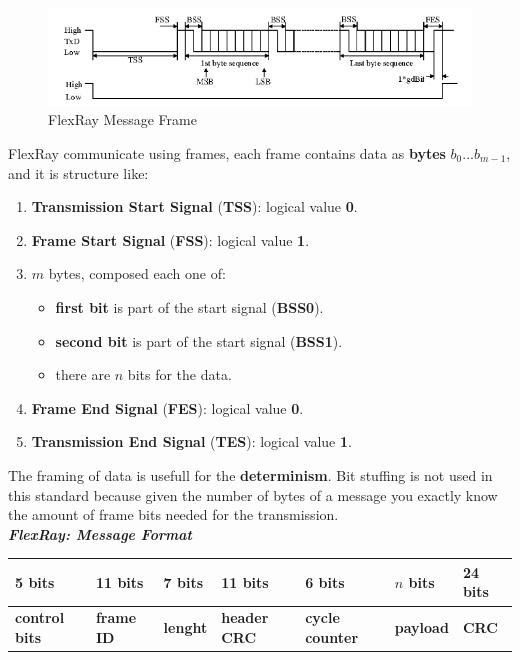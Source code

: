 \begin{figure}[h]
    \centering
    \includegraphics[width=\textwidth]{img/flexray_frame}
    \caption{FlexRay Message Frame}
\end{figure}
FlexRay communicate using frames, each frame contains data as \textbf{bytes} $b_0... b_{m-1}$, and it is structure like:
\begin{enumerate}[nosep]
    \item \textbf{Transmission Start Signal} (\textbf{TSS}): logical value \textbf{0}.
    \item \textbf{Frame Start Signal} (\textbf{FSS}): logical value \textbf{1}.
    \item $m$ bytes, composed each one of:
    \begin{itemize}[nosep]
        \item \textbf{first bit} is part of the start signal (\textbf{BSS0}).
        \item \textbf{second bit} is part of the start signal (\textbf{BSS1}).
        \item there are $n$ bits for the data.
    \end{itemize}
    \item \textbf{Frame End Signal} (\textbf{FES}): logical value \textbf{0}.
    \item \textbf{Transmission End Signal} (\textbf{TES}): logical value \textbf{1}.
\end{enumerate}
The framing of data is usefull for the \textbf{determinism}. Bit stuffing is not used in this standard because given the number of bytes of a message you exactly know the amount of frame bits needed for the transmission. \\ \newline
\textbf{\textit{FlexRay: Message Format}} \\ \newline
\begin{tabular}{ | p{2cm} | p{2cm} |  p{2cm} |  p{2cm} |  p{2cm} |  p{2cm} |  p{2cm} | } \hline
    5 bits & 11 bits & 7 bits & 11 bits & 6 bits & $n$ bits & 24 bits \\ \hline
    \textbf{control bits} & \textbf{frame ID} & \textbf{lenght} & \textbf{header CRC} & \textbf{cycle counter} & \textbf{payload} & \textbf{CRC} \\ \hline
\end{tabular}
